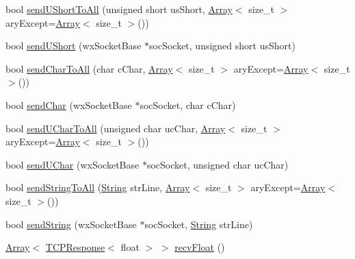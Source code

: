 \begin{DoxyCompactItemize}
\item 
bool \mbox{\hyperlink{class_rad_j_a_v_1_1_networking_1_1wx_widgets_t_c_p_server_a8b5f3d3a55504d84a69fa765c11d737f}{send\+U\+Short\+To\+All}} (unsigned short us\+Short, \mbox{\hyperlink{class_rad_j_a_v_1_1_array}{Array}}$<$ size\+\_\+t $>$ ary\+Except=\mbox{\hyperlink{class_rad_j_a_v_1_1_array}{Array}}$<$ size\+\_\+t $>$())
\item 
bool \mbox{\hyperlink{class_rad_j_a_v_1_1_networking_1_1wx_widgets_t_c_p_server_ab0c0c636b5b9eedba7402d18f177005d}{send\+U\+Short}} (wx\+Socket\+Base $\ast$soc\+Socket, unsigned short us\+Short)
\item 
bool \mbox{\hyperlink{class_rad_j_a_v_1_1_networking_1_1wx_widgets_t_c_p_server_a4a78814fc536f2c8a932d3fcf8c2c1dd}{send\+Char\+To\+All}} (char c\+Char, \mbox{\hyperlink{class_rad_j_a_v_1_1_array}{Array}}$<$ size\+\_\+t $>$ ary\+Except=\mbox{\hyperlink{class_rad_j_a_v_1_1_array}{Array}}$<$ size\+\_\+t $>$())
\item 
bool \mbox{\hyperlink{class_rad_j_a_v_1_1_networking_1_1wx_widgets_t_c_p_server_ae40280956d8bba29f636b6104c08b719}{send\+Char}} (wx\+Socket\+Base $\ast$soc\+Socket, char c\+Char)
\item 
bool \mbox{\hyperlink{class_rad_j_a_v_1_1_networking_1_1wx_widgets_t_c_p_server_a5a2d9c4355ceaac7d771475b2549b8e1}{send\+U\+Char\+To\+All}} (unsigned char uc\+Char, \mbox{\hyperlink{class_rad_j_a_v_1_1_array}{Array}}$<$ size\+\_\+t $>$ ary\+Except=\mbox{\hyperlink{class_rad_j_a_v_1_1_array}{Array}}$<$ size\+\_\+t $>$())
\item 
bool \mbox{\hyperlink{class_rad_j_a_v_1_1_networking_1_1wx_widgets_t_c_p_server_adf18ccc8867bb45e801a0ad699e14cbe}{send\+U\+Char}} (wx\+Socket\+Base $\ast$soc\+Socket, unsigned char uc\+Char)
\item 
bool \mbox{\hyperlink{class_rad_j_a_v_1_1_networking_1_1wx_widgets_t_c_p_server_aeca58079e59ba29af8d74292c4312bc7}{send\+String\+To\+All}} (\mbox{\hyperlink{class_rad_j_a_v_1_1_string}{String}} str\+Line, \mbox{\hyperlink{class_rad_j_a_v_1_1_array}{Array}}$<$ size\+\_\+t $>$ ary\+Except=\mbox{\hyperlink{class_rad_j_a_v_1_1_array}{Array}}$<$ size\+\_\+t $>$())
\item 
bool \mbox{\hyperlink{class_rad_j_a_v_1_1_networking_1_1wx_widgets_t_c_p_server_a60916dc2a924530fe488de6d7d38659b}{send\+String}} (wx\+Socket\+Base $\ast$soc\+Socket, \mbox{\hyperlink{class_rad_j_a_v_1_1_string}{String}} str\+Line)
\item 
\mbox{\hyperlink{class_rad_j_a_v_1_1_array}{Array}}$<$ \mbox{\hyperlink{class_rad_j_a_v_1_1_networking_1_1_t_c_p_response}{T\+C\+P\+Response}}$<$ float $>$ $>$ \mbox{\hyperlink{class_rad_j_a_v_1_1_networking_1_1wx_widgets_t_c_p_server_a6d166a7063da355d649fe8b1f75f44c9}{recv\+Float}} ()

\end{DoxyCompactItemize}
